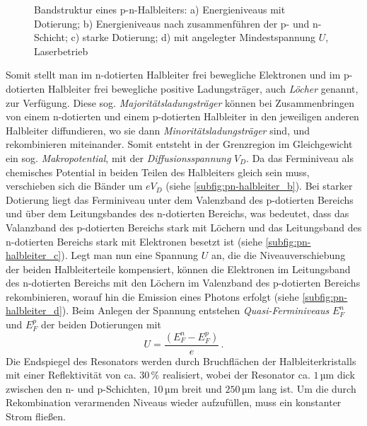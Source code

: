 \begin{figure}[h]
{{{	  	}
	}}
	\caption[Bandstruktur Halbleiterlaser]{Bandstruktur eines p-n-Halbleiters: a)
	Energieniveaus mit Dotierung; b) Energieniveaus nach
	zusammenführen der p- und n-Schicht; c) starke
	Dotierung; d) mit angelegter Mindestspannung $U$,
	Laserbetrieb}\label{fig:pn-halbleiter}
\end{figure}
Somit stellt
man im n-dotierten Halbleiter frei bewegliche Elektronen und im p-dotierten Halbleiter frei bewegliche positive
Ladungsträger, auch \textit{Löcher} genannt, zur Verfügung. Diese sog.
\textit{Majoritätsladungsträger} können bei Zusammenbringen von einem
n-dotierten und einem p-dotierten Halbleiter in den jeweiligen anderen
Halbleiter diffundieren, wo sie dann \textit{Minoritätsladungsträger} sind, und
rekombinieren miteinander. Somit entsteht in der Grenzregion im Gleichgewicht
ein sog. \textit{Makropotential}, mit der \textit{Diffusionsspannung} $V_D$. Da
das Ferminiveau als chemisches Potential in beiden Teilen des Halbleiters gleich
sein muss, verschieben sich die Bänder um $eV_D$ (siehe
\ref{subfig:pn-halbleiter_b}). Bei starker Dotierung liegt das Ferminiveau unter
dem Valenzband des p-dotierten Bereichs und über dem Leitungsbandes des
n-dotierten Bereichs, was bedeutet, dass das Valanzband des p-dotierten Bereichs
stark mit Löchern und das Leitungsband des n-dotierten Bereichs stark mit
Elektronen besetzt ist (siehe \ref{subfig:pn-halbleiter_c}). Legt man nun eine
Spannung $U$ an, die die Niveauverschiebung der beiden Halbleiterteile
kompensiert, können die Elektronen im Leitungsband des n-dotierten Bereichs mit
den Löchern im Valenzband des p-dotierten Bereichs rekombinieren, worauf hin
die Emission eines Photons erfolgt (siehe \ref{subfig:pn-halbleiter_d}). Beim
Anlegen der Spannung entstehen \textit{Quasi-Ferminiveaus} $E_F^n$ und $E_F^p$
der beiden Dotierungen mit
\begin{equation}\label{eq:quasi-ferminiveaus}
	U=\frac{\left(E_F^n-E_F^p\right)}{e}\,.
\end{equation}
Die Endspiegel des Resonators werden durch Bruchflächen der Halbleiterkristalls
mit einer Reflektivität von ca. $30\,\%$ realisiert, wobei der Resonator ca.
$1\,$µm dick zwischen den n- und p-Schichten, $10\,$µm breit und $250\,$µm
lang ist. Um die durch
Rekombination verarmenden Niveaus wieder aufzufüllen, muss ein konstanter Strom
fließen.

